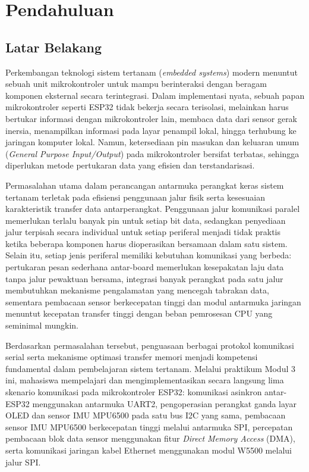 \section{Pendahuluan}

\subsection{Latar Belakang}
Perkembangan teknologi sistem tertanam (\textit{embedded systems}) modern menuntut sebuah unit mikrokontroler untuk mampu berinteraksi dengan beragam komponen eksternal secara terintegrasi. Dalam implementasi nyata, sebuah papan mikrokontroler seperti ESP32 tidak bekerja secara terisolasi, melainkan harus bertukar informasi dengan mikrokontroler lain, membaca data dari sensor gerak inersia, menampilkan informasi pada layar penampil lokal, hingga terhubung ke jaringan komputer lokal. Namun, ketersediaan pin masukan dan keluaran umum (\textit{General Purpose Input/Output}) pada mikrokontroler bersifat terbatas, sehingga diperlukan metode pertukaran data yang efisien dan terstandarisasi.

Permasalahan utama dalam perancangan antarmuka perangkat keras sistem tertanam terletak pada efisiensi penggunaan jalur fisik serta kesesuaian karakteristik transfer data antarperangkat. Penggunaan jalur komunikasi paralel memerlukan terlalu banyak pin untuk setiap bit data, sedangkan penyediaan jalur terpisah secara individual untuk setiap periferal menjadi tidak praktis ketika beberapa komponen harus dioperasikan bersamaan dalam satu sistem. Selain itu, setiap jenis periferal memiliki kebutuhan komunikasi yang berbeda: pertukaran pesan sederhana antar-board memerlukan kesepakatan laju data tanpa jalur pewaktuan bersama, integrasi banyak perangkat pada satu jalur membutuhkan mekanisme pengalamatan yang mencegah tabrakan data, sementara pembacaan sensor berkecepatan tinggi dan modul antarmuka jaringan menuntut kecepatan transfer tinggi dengan beban pemrosesan CPU yang seminimal mungkin.

Berdasarkan permasalahan tersebut, penguasaan berbagai protokol komunikasi serial serta mekanisme optimasi transfer memori menjadi kompetensi fundamental dalam pembelajaran sistem tertanam. Melalui praktikum Modul 3 ini, mahasiswa mempelajari dan mengimplementasikan secara langsung lima skenario komunikasi pada mikrokontroler ESP32: komunikasi asinkron antar-ESP32 menggunakan antarmuka UART2, pengoperasian perangkat ganda layar OLED dan sensor IMU MPU6500 pada satu bus I2C yang sama, pembacaan sensor IMU MPU6500 berkecepatan tinggi melalui antarmuka SPI, percepatan pembacaan blok data sensor menggunakan fitur \textit{Direct Memory Access} (DMA), serta komunikasi jaringan kabel Ethernet menggunakan modul W5500 melalui jalur SPI.

